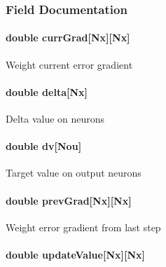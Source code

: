 \subsubsection{Field Documentation}
\hypertarget{structann__t_ad634fb273a77c89ef50752fe62499b4f}{
\paragraph[{curr\+Grad}]{\setlength{\rightskip}{0pt plus 5cm}double curr\+Grad\mbox{[}Nx\mbox{]}\mbox{[}Nx\mbox{]}}}\label{structann__t_ad634fb273a77c89ef50752fe62499b4f}
Weight current error gradient \hypertarget{structann__t_a610000125df6a3004a1a0768bee350be}{
\paragraph[{delta}]{\setlength{\rightskip}{0pt plus 5cm}double delta\mbox{[}Nx\mbox{]}}}\label{structann__t_a610000125df6a3004a1a0768bee350be}
Delta value on neurons \hypertarget{structann__t_a3cd26d516c0d78e0bd8e83f7b5d96056}{
\paragraph[{dv}]{\setlength{\rightskip}{0pt plus 5cm}double dv\mbox{[}{\bf Nou}\mbox{]}}}\label{structann__t_a3cd26d516c0d78e0bd8e83f7b5d96056}
Target value on output neurons \hypertarget{structann__t_ae668825bd99ec5a8e701cd34833d92c8}{
\paragraph[{prev\+Grad}]{\setlength{\rightskip}{0pt plus 5cm}double prev\+Grad\mbox{[}Nx\mbox{]}\mbox{[}Nx\mbox{]}}}\label{structann__t_ae668825bd99ec5a8e701cd34833d92c8}
Weight error gradient from last step \hypertarget{structann__t_a56f1cf095bad5da7e0c944dd9727293a}{
\paragraph[{update\+Value}]{\setlength{\rightskip}{0pt plus 5cm}double update\+Value\mbox{[}Nx\mbox{]}\mbox{[}Nx\mbox{]}}}\label{structann__t_a56f1cf095bad5da7e0c944dd9727293a}

